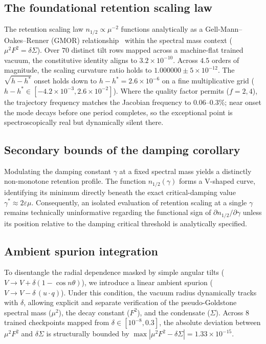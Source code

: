 \documentclass[mlabstract,onecolumn]{jmlr}
\begin{document}
\subsection{The foundational retention scaling law} The retention scaling law $n_{1/2}\propto\mu^{-2}$ functions analytically as a Gell-Mann--Oakes--Renner (GMOR) relationship~\citep{gell-mann_behavior_1968} within the spectral mass context ($\mu^2F^2=\delta\Sigma$). Over $70$ distinct tilt rows mapped across a machine-flat trained vacuum, the constitutive identity aligns to $3.2{\times}10^{-10}$. Across $4.5$ orders of magnitude, the scaling curvature ratio holds to $1.000000\pm5{\times}10^{-12}$. The $\sqrt{h-h^*}$ onset holds down to $h-h^*=2.6{\times}10^{-6}$ on a fine multiplicative grid ($h-h^*\in[-4.2{\times}10^{-3},2.6{\times}10^{-2}]$). Where the quality factor permits ($f=2,4$), the trajectory frequency matches the Jacobian frequency to $0.06$--$0.3\%$; near onset the mode decays before one period completes, so the exceptional point is spectroscopically real but dynamically silent there.

\subsection{Secondary bounds of the damping corollary} Modulating the damping constant $\gamma$ at a fixed spectral mass yields a distinctly non-monotone retention profile. The function $n_{1/2}(\gamma)$ forms a V-shaped curve, identifying its minimum directly beneath the exact critical-damping value $\gamma^*\approx2\varepsilon\mu$. Consequently, an isolated evaluation of retention scaling at a single $\gamma$ remains technically uninformative regarding the functional sign of $\partial n_{1/2}/\partial\gamma$ unless its position relative to the damping critical threshold is analytically specified.

\subsection{Ambient spurion integration} To disentangle the radial dependence masked by simple angular tilts ($V\to V+\delta(1-\cos n\theta)$), we introduce a linear ambient spurion ($V\to V-\delta\,(u\cdot q)$). Under this condition, the vacuum radius dynamically tracks with $\delta$, allowing explicit and separate verification of the pseudo-Goldstone spectral mass ($\mu^2$), the decay constant ($F^2$), and the condensate ($\Sigma$). Across $8$ trained checkpoints mapped from $\delta\in[10^{-8},0.3]$, the absolute deviation between $\mu^2F^2$ and $\delta\Sigma$ is structurally bounded by $\max|\mu^2F^2-\delta\Sigma|=1.33{\times}10^{-15}$.
\end{document}
